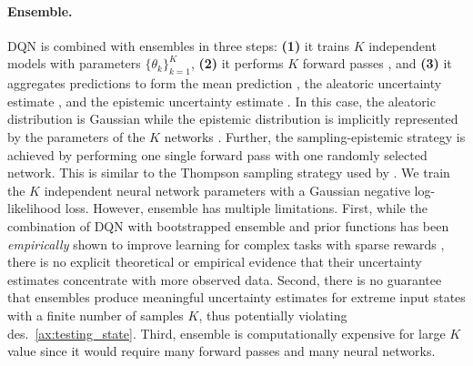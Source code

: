 \paragraph{Ensemble.} DQN is combined with ensembles \cite{ensembles} in three steps: \textbf{(1)} it trains $K$ independent models with parameters $\{\theta_k\}_{k=1}^K$, \textbf{(2)} it performs $K$ forward passes , and \textbf{(3)} it aggregates predictions to form the mean prediction , the aleatoric uncertainty estimate , and the epistemic uncertainty estimate . In this case, the aleatoric distribution is Gaussian while the epistemic distribution is implicitly represented by the parameters of the $K$ networks . Further, the sampling-epistemic strategy is achieved by performing one single forward pass with one randomly selected network. This is similar to the Thompson sampling strategy used by \cite{bootstrapped-dqn}. We train the $K$ independent neural network parameters  with a Gaussian negative log-likelihood loss. However, ensemble has multiple limitations. First, while the combination of DQN with bootstrapped ensemble and prior functions has been \emph{empirically} shown to improve learning for complex tasks with sparse rewards \cite{bootstrapped-dqn, randomized-prior-functions}, there is no explicit theoretical or empirical evidence that their uncertainty estimates concentrate with more observed data. Second, there is no guarantee that ensembles produce meaningful uncertainty estimates for extreme input states with a finite number of samples $K$, thus potentially violating des.~\ref{ax:testing_state}. Third, ensemble is computationally expensive for large $K$ value since it would require many forward passes and many neural networks. 


